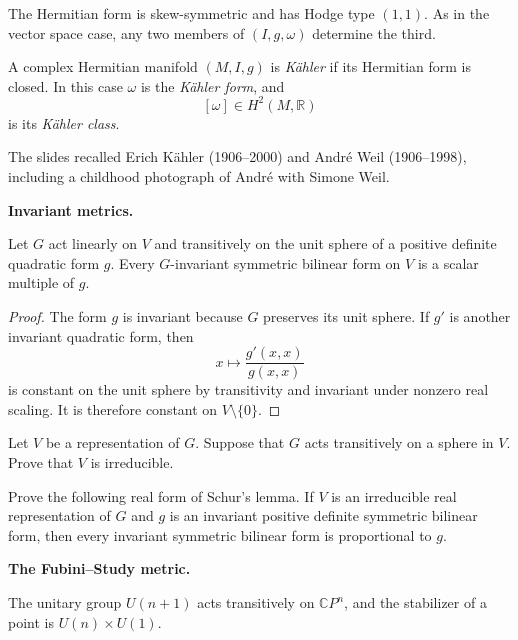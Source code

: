 The Hermitian form is skew-symmetric and
has Hodge type $(1,1)$. As in the vector
space case, any two members of
$(I,g,\omega)$ determine the third.

\begin{definition}
\label{definition-kahler-manifold}
A complex Hermitian manifold $(M,I,g)$ is
{\it K\"ahler} if its Hermitian form is
closed. In this case $\omega$ is the
{\it K\"ahler form}, and
$$
[\omega]\in H^2(M,\mathbb{R})
$$
is its {\it K\"ahler class}.
\end{definition}

The slides recalled Erich K\"ahler
(1906--2000) and Andr\'e Weil
(1906--1998), including a childhood
photograph of Andr\'e with Simone Weil.

\medskip\noindent
{\bf Invariant metrics.}

\begin{theorem}
\label{theorem-transitive-sphere-form}
Let $G$ act linearly on $V$ and transitively
on the unit sphere of a positive definite
quadratic form $g$. Every $G$-invariant
symmetric bilinear form on $V$ is a scalar
multiple of $g$.
\end{theorem}

\begin{proof}
The form $g$ is invariant because $G$
preserves its unit sphere. If $g'$ is
another invariant quadratic form, then
$$
x\longmapsto\frac{g'(x,x)}{g(x,x)}
$$
is constant on the unit sphere by
transitivity and invariant under nonzero
real scaling. It is therefore constant on
$V\setminus\{0\}$.
\end{proof}

\begin{exercise}
\label{exercise-transitive-irreducible}
Let $V$ be a representation of $G$. Suppose
that $G$ acts transitively on a sphere in
$V$. Prove that $V$ is irreducible.
\end{exercise}

\begin{exercise}
\label{exercise-real-schur-form}
Prove the following real form of Schur's
lemma. If $V$ is an irreducible real
representation of $G$ and $g$ is an
invariant positive definite symmetric
bilinear form, then every invariant
symmetric bilinear form is proportional to
$g$.
\end{exercise}

\medskip\noindent
{\bf The Fubini--Study metric.}

The unitary group $U(n+1)$ acts transitively
on $\mathbb{C}P^n$, and the stabilizer of a
point is $U(n)\times U(1)$.

